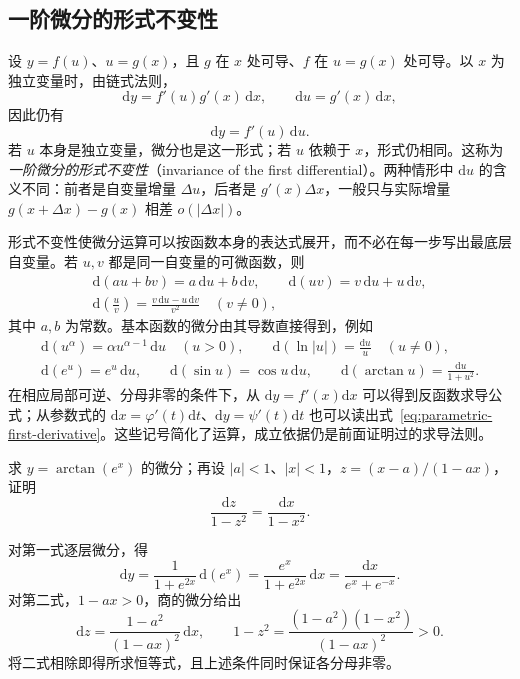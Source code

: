 \subsection{一阶微分的形式不变性}
\label{subsec:invariance-of-first-differentials}

设 $y=f(u)$、$u=g(x)$，且 $g$ 在 $x$ 处可导、$f$ 在 $u=g(x)$ 处可导。以 $x$ 为独立变量时，由链式法则，
\[
    \mathrm dy=f'(u)g'(x)\,\mathrm dx,
    \qquad \mathrm du=g'(x)\,\mathrm dx,
\]
因此仍有
\begin{equation}
\label{eq:invariance-of-first-differential}
    \mathrm dy=f'(u)\,\mathrm du.
\end{equation}
若 $u$ 本身是独立变量，微分也是这一形式；若 $u$ 依赖于 $x$，形式仍相同。这称为\emph{一阶微分的形式不变性}（invariance of the first differential）。两种情形中 $\mathrm du$ 的含义不同：前者是自变量增量 $\Delta u$，后者是 $g'(x)\Delta x$，一般只与实际增量 $g(x+\Delta x)-g(x)$ 相差 $o(|\Delta x|)$。

形式不变性使微分运算可以按函数本身的表达式展开，而不必在每一步写出最底层自变量。若 $u,v$ 都是同一自变量的可微函数，则
\begin{equation}
\label{eq:differential-arithmetic-rules}
\begin{gathered}
    \mathrm d(au+bv)=a\,\mathrm du+b\,\mathrm dv,\qquad
    \mathrm d(uv)=v\,\mathrm du+u\,\mathrm dv,\\
    \mathrm d\left(\frac uv\right)
    =\frac{v\,\mathrm du-u\,\mathrm dv}{v^2}\quad(v\ne0),
\end{gathered}
\end{equation}
其中 $a,b$ 为常数。基本函数的微分由其导数直接得到，例如
\[
\begin{gathered}
    \mathrm d(u^\alpha)=\alpha u^{\alpha-1}\,\mathrm du\quad(u>0),\qquad
    \mathrm d(\ln|u|)=\frac{\mathrm du}u\quad(u\ne0),\\
    \mathrm d(e^u)=e^u\,\mathrm du,\qquad
    \mathrm d(\sin u)=\cos u\,\mathrm du,\qquad
    \mathrm d(\arctan u)=\frac{\mathrm du}{1+u^2}.
\end{gathered}
\]
在相应局部可逆、分母非零的条件下，从 $\mathrm dy=f'(x)\mathrm dx$ 可以得到反函数求导公式；从参数式的 $\mathrm dx=\varphi'(t)\mathrm dt$、$\mathrm dy=\psi'(t)\mathrm dt$ 也可以读出式~\eqref{eq:parametric-first-derivative}。这些记号简化了运算，成立依据仍是前面证明过的求导法则。

\begin{example}
\label{ex:differentials-of-composite-and-fractional-functions}
求 $y=\arctan(e^x)$ 的微分；再设 $|a|<1$、$|x|<1$，$z=(x-a)/(1-ax)$，证明
\[
    \frac{\mathrm dz}{1-z^2}=\frac{\mathrm dx}{1-x^2}.
\]
\end{example}
\begin{solve}
对第一式逐层微分，得
\[
    \mathrm dy=\frac1{1+e^{2x}}\,\mathrm d(e^x)
    =\frac{e^x}{1+e^{2x}}\,\mathrm dx
    =\frac{\mathrm dx}{e^x+e^{-x}}.
\]
对第二式，$1-ax>0$，商的微分给出
\[
    \mathrm dz=\frac{1-a^2}{(1-ax)^2}\,\mathrm dx,
    \qquad
    1-z^2=\frac{(1-a^2)(1-x^2)}{(1-ax)^2}>0.
\]
将二式相除即得所求恒等式，且上述条件同时保证各分母非零。
\end{solve}

